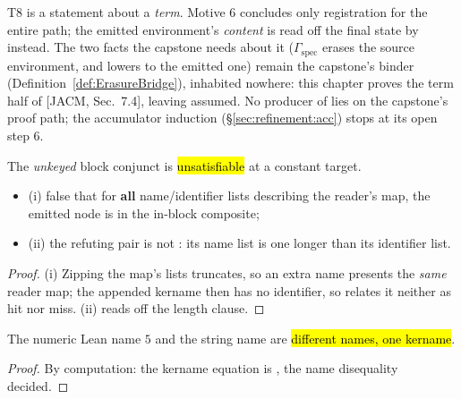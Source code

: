 T8 is a statement about a \emph{term}. Motive 6 concludes only registration for the entire path; the
emitted environment's \emph{content} is read off the final state by  instead. The two
facts the capstone needs about it ($\Gamma_{\mathrm{spec}}$ erases the source environment, and lowers to
the emitted one) remain the capstone's binder  (Definition~\ref{def:ErasureBridge}),
inhabited nowhere: this chapter proves the term half of [JACM, Sec.~7.4], leaving
 assumed. No producer of  lies on the capstone's proof path; the
accumulator induction (\S\ref{sec:refinement:acc}) stops at its open step 6.

\begin{lemma}
\label{lem:erasesLBMode_block_refuted}
\leanok
{}
 The \emph{unkeyed} block conjunct is \hl{unsatisfiable} at a constant target.
\begin{itemize}
\item (i) false that for \textbf{all} name/identifier lists describing the reader's map, the emitted
 node is in the in-block composite;
\item (ii) the refuting pair is not : its name list is one longer than its identifier
list.
\end{itemize}
\end{lemma}
\begin{proof}
\leanok
{}
 (i) Zipping the map's lists truncates, so an extra name presents the \emph{same} reader map;
the appended kername then has no identifier, so  relates it neither as hit nor miss.
(ii) reads off the length clause.
\end{proof}

\begin{lemma}
\label{lem:toKername_not_injective}
\leanok
{}
 The numeric Lean name $5$ and the string name  are \hl{different names, one
kername}.
\end{lemma}
\begin{proof}
\leanok
{} By computation: the kername equation is , the name disequality decided.
\end{proof}

